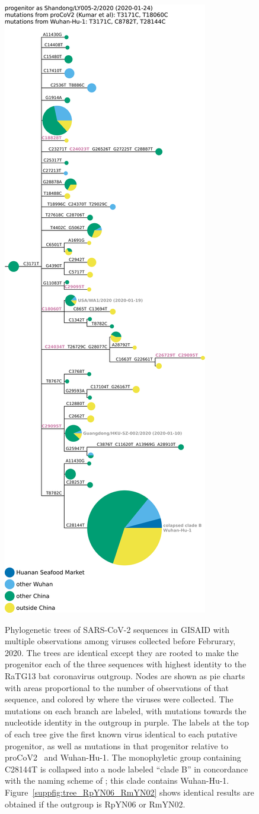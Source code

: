 \documentclass[9pt,twocolumn,twoside]{gsajnl_modified}
\begin{document}
\begin{figure}
{  \hspace{0.02\linewidth}
 \includegraphics[width=0.31\linewidth, valign=t, clip=true, trim=0in 4.4in 0in 0in]{figures/tree_images/hCoV-19-Shandong-LY005-2-2020_RaTG13_without_deleted_seqs.pdf}
 }
 \caption{
 Phylogenetic trees of SARS-CoV-2 sequences in GISAID with multiple observations among viruses collected before Februrary, 2020.
 The trees are identical except they are rooted to make the progenitor each of the three sequences with highest identity to the RaTG13 bat coronavirus outgroup.
Nodes are shown as pie charts with areas proportional to the number of observations of that sequence, and colored by where the viruses were collected.
The mutations on each branch are labeled, with mutations towards the nucleotide identity in the outgroup in purple.
The labels at the top of each tree give the first known virus identical to each putative progenitor, as well as mutations in that progenitor relative to proCoV2~\citep{kumar2021evolutionary} and Wuhan-Hu-1.
The monophyletic group containing C28144T is collapsed into a node labeled ``clade B'' in concordance with the naming scheme of \citet{rambaut2020dynamic}; this clade contains Wuhan-Hu-1.
 Figure~\ref{suppfig:tree_RpYN06_RmYN02} shows identical results are obtained if the outgroup is RpYN06 or RmYN02.
\label{fig:tree_RaTG13}
 }
 \end{figure}
\end{document}
